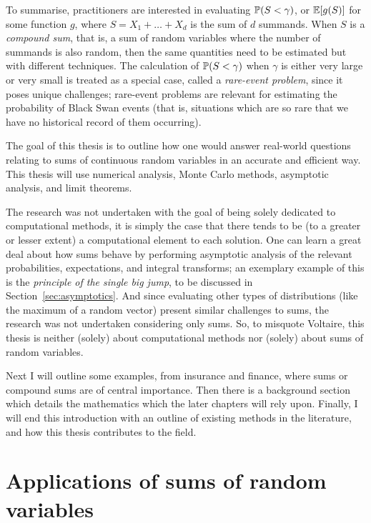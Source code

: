 To summarise, practitioners are interested in evaluating $\operatorname{{\mathbb P}}(S < \gamma)$, or $\operatorname{{\mathbb E}}[g(S)]$ for some function $g$, where $S = X_1 + \dots + X_d$ is the sum of $d$ summands. When $S$ is a \emph{compound sum}, that is, a sum of random variables where the number of summands is also random, then the same quantities need to be estimated but with different techniques. The calculation of $\operatorname{{\mathbb P}}(S < \gamma)$ when $\gamma$ is either very large or very small is treated as a special case, called a \emph{rare-event problem}, since it poses unique challenges; rare-event problems are relevant for estimating the probability of Black Swan events (that is, situations which are so rare that we have no historical record of them occurring).

The goal of this thesis is to outline how one would answer real-world questions relating to sums of continuous random variables in an accurate and efficient way. This thesis will use numerical analysis, Monte Carlo methods, asymptotic analysis, and limit theorems.

The research was not undertaken with the goal of being solely dedicated to computational methods, it is simply the case that there tends to be (to a greater or lesser extent) a computational element to each solution. One can learn a great deal about how sums behave by performing asymptotic analysis of the relevant probabilities, expectations, and integral transforms; an exemplary example of this is the \emph{principle of the single big jump}, to be discussed in Section~\ref{sec:asymptotics}.
And since evaluating other types of distributions (like the maximum of a random vector) present similar challenges to sums, the research was not undertaken considering only sums. So, to misquote Voltaire, this thesis is neither (solely) about computational methods nor (solely) about sums of random variables.

Next I will outline some examples, from insurance and finance, where sums or compound sums are of central importance. Then there is a background section which details the mathematics which the later chapters will rely upon. Finally, I will end this introduction with an outline of existing methods in the literature, and how this thesis contributes to the field.

\section{Applications of sums of random variables}

